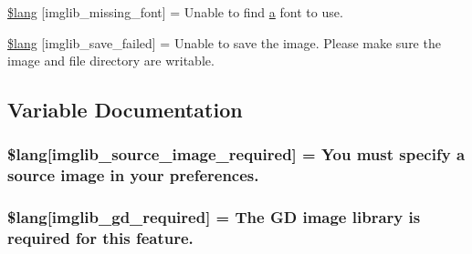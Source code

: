 \begin{DoxyCompactItemize}
\item 
\hyperlink{system_2language_2english_2imglib__lang_8php_a935800aad2be18ca4fe99bb074674848}{\$lang} \mbox{[}\textquotesingle{}imglib\+\_\+missing\+\_\+font\textquotesingle{}\mbox{]} = \textquotesingle{}Unable to find \hyperlink{_admin_2assets_2js_2bootstrap_8min_8js_a1f5870dcf487187f13d5fd328ed9e6e7}{a} font to use.\textquotesingle{}
\item 
\hyperlink{system_2language_2english_2imglib__lang_8php_a4d7a99fddc60c97a7327fa0125dea264}{\$lang} \mbox{[}\textquotesingle{}imglib\+\_\+save\+\_\+failed\textquotesingle{}\mbox{]} = \textquotesingle{}Unable to save the image. Please make sure the image and file directory are writable.\textquotesingle{}
\end{DoxyCompactItemize}


\subsection{Variable Documentation}
\hypertarget{system_2language_2english_2imglib__lang_8php_af48787ab142f633036ebdf1cc5da7409}{}
\subsubsection[{\$lang}]{\setlength{\rightskip}{0pt plus 5cm}\$lang\mbox{[}\textquotesingle{}imglib\+\_\+source\+\_\+image\+\_\+required\textquotesingle{}\mbox{]} = \textquotesingle{}You must specify {\bf a} source image in your preferences.\textquotesingle{}}\label{system_2language_2english_2imglib__lang_8php_af48787ab142f633036ebdf1cc5da7409}
\hypertarget{system_2language_2english_2imglib__lang_8php_aa8d7f8276e62fbe759daef2021c16552}{}
\subsubsection[{\$lang}]{\setlength{\rightskip}{0pt plus 5cm}\$lang\mbox{[}\textquotesingle{}imglib\+\_\+gd\+\_\+required\textquotesingle{}\mbox{]} = \textquotesingle{}The G\+D image library is required {\bf for} this feature.\textquotesingle{}}\label{system_2language_2english_2imglib__lang_8php_aa8d7f8276e62fbe759daef2021c16552}
\hypertarget{system_2language_2english_2imglib__lang_8php_a0da9c99f9e2b5f38ccbefb9d9f702c5e}{}

